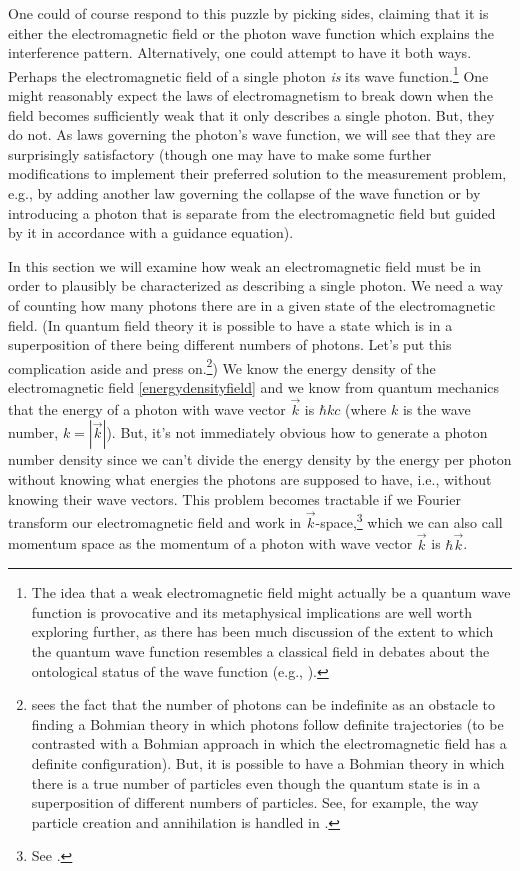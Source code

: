 \documentclass[12pt,secnumarabic,amsmath,amssymb,balancelastpage,nofootinbib]{article}
\begin{document}
One could of course respond to this puzzle by picking sides, claiming that it is either the electromagnetic field or the photon wave function which explains the interference pattern.  Alternatively, one could attempt to have it both ways.  Perhaps the electromagnetic field of a single photon \emph{is} its wave function.\footnote{The idea that a weak electromagnetic field might actually be a quantum wave function is provocative and its metaphysical implications are well worth exploring further, as there has been much discussion of the extent to which the quantum wave function resembles a classical field in debates about the ontological status of the wave function (e.g., \citealp{neyalbert}).} One might reasonably expect the laws of electromagnetism to break down when the field becomes sufficiently weak that it only describes a single photon.  But, they do not.  As laws governing the photon's wave function, we will see that they are surprisingly satisfactory (though one may have to make some further modifications to implement their preferred solution to the measurement problem, e.g., by adding another law governing the collapse of the wave function or by introducing a photon that is separate from the electromagnetic field but guided by it in accordance with a guidance equation).



In this section we will examine how weak an electromagnetic field must be in order to plausibly be characterized as describing a single photon.  We need a way of counting how many photons there are in a given state of the electromagnetic field.  (In quantum field theory it is possible to have a state which is in a superposition of there being different numbers of photons.  Let's put this complication aside and press on.\footnote{\citet[pg.\ 540--541, 545]{holland} sees the fact that the number of photons can be indefinite as an obstacle to finding a Bohmian theory in which photons follow definite trajectories (to be contrasted with a Bohmian approach in which the electromagnetic field has a definite configuration).  But, it is possible to have a Bohmian theory in which there is a true number of particles even though the quantum state is in a superposition of different numbers of particles.  See, for example, the way particle creation and annihilation is handled in \citet{dgz2004}.})  We know the energy density of the electromagnetic field \eqref{energydensityfield} and we know from quantum mechanics that the energy of a photon with wave vector $\vec{k}$ is $\hbar k c$ (where $k$ is the wave number, $k=|\vec{k}|$).  But, it's not immediately obvious how to generate a photon number density since we can't divide the energy density by the energy per photon without knowing what energies the photons are supposed to have, i.e., without knowing their wave vectors.  This problem becomes tractable if we Fourier transform our electromagnetic field and work in $\vec{k}$-space,\footnote{See \citet[sec.\ 1.2]{ab1965}.} which we can also call momentum space as the momentum of a photon with wave vector $\vec{k}$ is $\hbar\vec{k}$.
\end{document}
